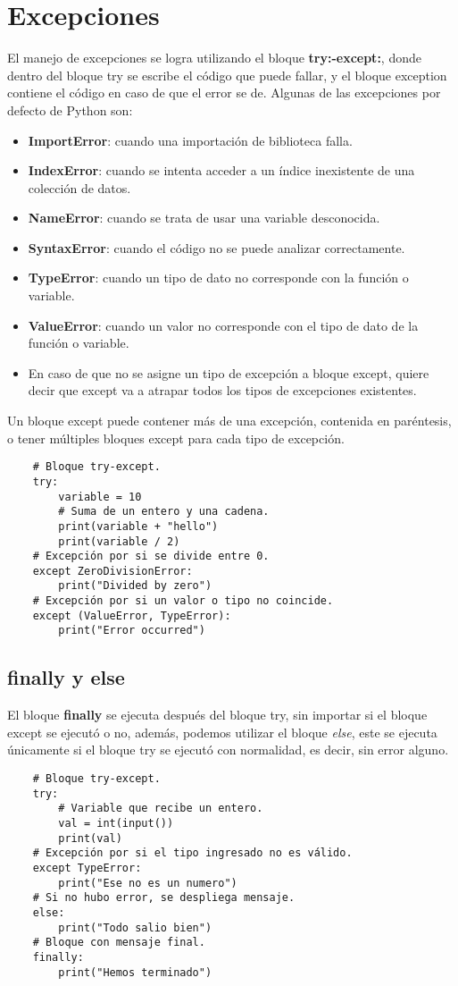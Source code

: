 \section{Excepciones}

El manejo de excepciones se logra utilizando el bloque \textbf{try:-except:}, donde dentro del bloque try se escribe el código que puede fallar, y el bloque exception contiene el código en caso de que el error se de. Algunas de las excepciones por defecto de Python son:
\begin{itemize}
	\item \textbf{ImportError}: cuando una importación de biblioteca falla.
	\item \textbf{IndexError}: cuando se intenta acceder a un índice inexistente de una colección de datos.
	\item \textbf{NameError}: cuando se trata de usar una variable desconocida.
	\item \textbf{SyntaxError}: cuando el código no se puede analizar correctamente.
	\item \textbf{TypeError}: cuando un tipo de dato no corresponde con la función o variable.
	\item \textbf{ValueError}: cuando un valor no corresponde con el tipo de dato de la función o variable.
	\item En caso de que no se asigne un tipo de excepción a bloque except, quiere decir que except va a atrapar todos los tipos de excepciones existentes.
\end{itemize}

Un bloque except puede contener más de una excepción, contenida en paréntesis, o tener múltiples bloques except para cada tipo de excepción.
\begin{lstlisting}
    # Bloque try-except.
    try:
        variable = 10
        # Suma de un entero y una cadena.
        print(variable + "hello")
        print(variable / 2)
    # Excepción por si se divide entre 0.
    except ZeroDivisionError:
        print("Divided by zero")
    # Excepción por si un valor o tipo no coincide.
    except (ValueError, TypeError):
        print("Error occurred")
\end{lstlisting}


\subsection{finally y else}

El bloque \textbf{finally} se ejecuta después del bloque try, sin importar si el bloque except se ejecutó o no, además, podemos utilizar el bloque \textit{else}, este se ejecuta únicamente si el bloque try se ejecutó con normalidad, es decir, sin error alguno.
\begin{lstlisting}
    # Bloque try-except.   
    try:
        # Variable que recibe un entero.
        val = int(input())
        print(val)
    # Excepción por si el tipo ingresado no es válido.
    except TypeError:
        print("Ese no es un numero")
    # Si no hubo error, se despliega mensaje.
    else:
        print("Todo salio bien")
    # Bloque con mensaje final.
    finally:
        print("Hemos terminado")
\end{lstlisting}


